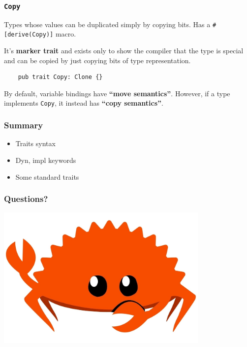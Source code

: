 \documentclass[aspectratio=1610,t]{beamer}
\begin{document}

\begin{frame}[fragile]
\frametitle{\texttt{Copy}}
Types whose values can be duplicated simply by copying bits. Has a \texttt{\#[derive(Copy)]} macro.

It's \textbf{marker trait} and exists only to show the compiler that the type is special and can be copied by just copying bits of type representation.

\begin{verbatim}
    pub trait Copy: Clone {}
\end{verbatim}

By default, variable bindings have \textbf{``move semantics''}. However, if a type implements \texttt{Copy}, it instead has \textbf{``copy semantics''}.
\end{frame}


\begin{frame}
\frametitle{Summary}
\begin{itemize}
    \item Traits syntax
    \item Dyn, impl keywords
    \item Some standard traits
\end{itemize}
\end{frame}


\begin{frame}
\frametitle{Questions?}
\begin{center}
\includegraphics[width=\textwidth,height=7cm,keepaspectratio]{images/crab.jpg}
\end{center}
\end{frame}

\end{document}
